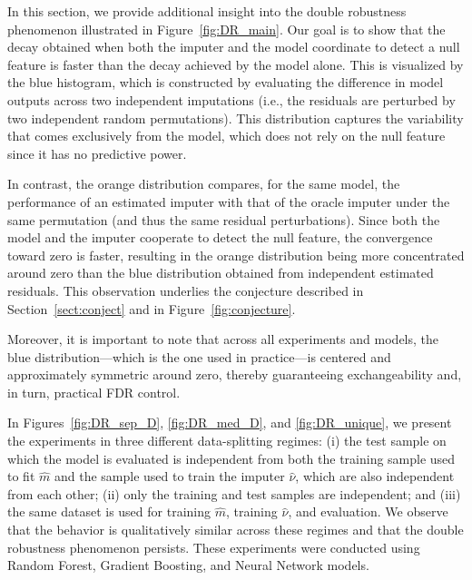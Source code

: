 \documentclass{article}
\theoremstyle{plain}
\theoremstyle{definition}
\theoremstyle{remark}
\begin{document}
In this section, we provide additional insight into the double robustness phenomenon illustrated in Figure~\ref{fig:DR_main}. Our goal is to show that the decay obtained when both the imputer and the model coordinate to detect a null feature is faster than the decay achieved by the model alone. This is visualized by the blue histogram, which is constructed by evaluating the difference in model outputs across two independent imputations (i.e., the residuals are perturbed by two independent random permutations). This distribution captures the variability that comes exclusively from the model, which does not rely on the null feature since it has no predictive power.

In contrast, the orange distribution compares, for the same model, the performance of an estimated imputer with that of the oracle imputer under the same permutation (and thus the same residual perturbations). Since both the model and the imputer cooperate to detect the null feature, the convergence toward zero is faster, resulting in the orange distribution being more concentrated around zero than the blue distribution obtained from independent estimated residuals. This observation underlies the conjecture described in Section~\ref{sect:conject} and in Figure~\ref{fig:conjecture}.

Moreover, it is important to note that across all experiments and models, the blue distribution—which is the one used in practice—is centered and approximately symmetric around zero, thereby guaranteeing exchangeability and, in turn, practical FDR control.
 
In Figures~\ref{fig:DR_sep_D}, \ref{fig:DR_med_D}, and \ref{fig:DR_unique}, we present the experiments in three different data-splitting regimes: (i) the test sample on which the model is evaluated is independent from both the training sample used to fit $\widehat{m}$ and the sample used to train the imputer $\widehat{\nu}$, which are also independent from each other; (ii) only the training and test samples are independent; and (iii) the same dataset is used for training $\widehat{m}$, training $\widehat{\nu}$, and evaluation. We observe that the behavior is qualitatively similar across these regimes and that the double robustness phenomenon persists. These experiments were conducted using Random Forest, Gradient Boosting, and Neural Network models.
\end{document}
